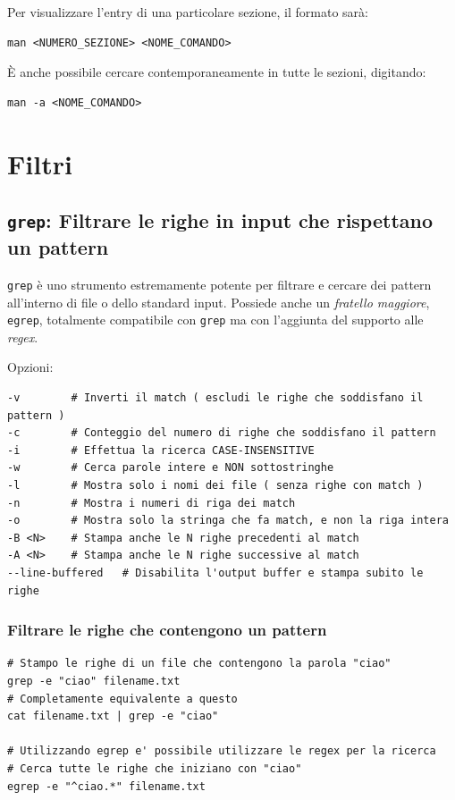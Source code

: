 \documentclass[a4paper]{report}
\newenvironment{code}{\begin{tcolorbox}[size=small]}{\end{tcolorbox}}
\begin{document}
\begin{code}
Per visualizzare l'entry di una particolare sezione, il formato sarà: 
\begin{lstlisting}
man <NUMERO_SEZIONE> <NOME_COMANDO>
\end{lstlisting}

È anche possibile cercare contemporaneamente in tutte le sezioni, digitando:
\begin{lstlisting}
man -a <NOME_COMANDO>
\end{lstlisting}
\end{code}

\chapter{Filtri}

\section{\texttt{grep}: Filtrare le righe in input che rispettano un pattern }

\texttt{grep} è uno strumento estremamente potente per filtrare e cercare dei pattern all'interno di file o dello standard input. 
Possiede anche un \textit{fratello maggiore}, \texttt{egrep}, totalmente compatibile con \texttt{grep} ma con l'aggiunta del supporto alle \textit{regex}.

Opzioni:
\begin{code}
\begin{lstlisting}
-v        # Inverti il match ( escludi le righe che soddisfano il pattern )
-c        # Conteggio del numero di righe che soddisfano il pattern
-i        # Effettua la ricerca CASE-INSENSITIVE
-w        # Cerca parole intere e NON sottostringhe
-l        # Mostra solo i nomi dei file ( senza righe con match )
-n        # Mostra i numeri di riga dei match
-o        # Mostra solo la stringa che fa match, e non la riga intera
-B <N>    # Stampa anche le N righe precedenti al match
-A <N>    # Stampa anche le N righe successive al match
--line-buffered   # Disabilita l'output buffer e stampa subito le righe
\end{lstlisting}
\end{code}

\subsection{Filtrare le righe che contengono un pattern}

\begin{code}
\begin{lstlisting}
# Stampo le righe di un file che contengono la parola "ciao"
grep -e "ciao" filename.txt
# Completamente equivalente a questo
cat filename.txt | grep -e "ciao"

# Utilizzando egrep e' possibile utilizzare le regex per la ricerca
# Cerca tutte le righe che iniziano con "ciao"
egrep -e "^ciao.*" filename.txt
\end{lstlisting}
\end{code}
\end{document}
